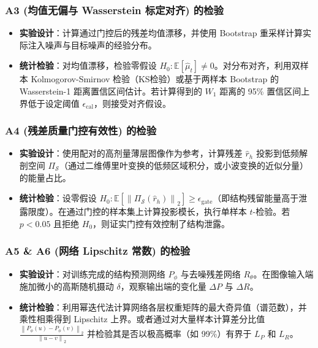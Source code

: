 \documentclass[11pt,a4paper,UTF8,fontset=fandol]{ctexart}
\theoremstyle{definition}
\newcommand{\norm}[1]{\left\lVert#1\right\rVert}
\newcommand{\E}{\mathbb{E}}
\newcommand{\cS}{\mathcal{S}}
\begin{document}
\subsubsection{A3 (均值无偏与 Wasserstein 标定对齐) 的检验}
\begin{itemize}[leftmargin=2em]
    \item \textbf{实验设计}：计算通过门控后的残差均值漂移，并使用 Bootstrap 重采样计算实际注入噪声与目标噪声的经验分布。
    \item \textbf{统计检验}：对均值漂移，检验零假设 $H_0: \E[\hat\mu_t] \ne 0$。对分布对齐，利用双样本 Kolmogorov-Smirnov 检验（KS检验）或基于两样本 Bootstrap 的 Wasserstein-1 距离置信区间估计。若计算得到的 $W_1$ 距离的 95\% 置信区间上界低于设定阈值 $\epsilon_{\mathrm{cal}}$，则接受对齐假设。
\end{itemize}

\subsubsection{A4 (残差质量门控有效性) 的检验}
\begin{itemize}[leftmargin=2em]
    \item \textbf{实验设计}：使用配对的高剂量薄层图像作为参考，计算残差 $\hat r_h$ 投影到低频解剖空间 $\Pi_{\cS}$（通过二维傅里叶变换的低频区域积分，或小波变换的近似分量）的能量占比。
    \item \textbf{统计检验}：设零假设 $H_0: \E[\norm{\Pi_{\cS}(\hat r_h)}_2] \ge \epsilon_{\mathrm{gate}}$（即结构残留能量高于泄露限度）。在通过门控的样本集上计算投影模长，执行单样本 $t$-检验。若 $p < 0.05$ 且拒绝 $H_0$，则证实门控有效控制了结构泄露。
\end{itemize}

\subsubsection{A5 \& A6 (网络 Lipschitz 常数) 的检验}
\begin{itemize}[leftmargin=2em]
    \item \textbf{实验设计}：对训练完成的结构预测网络 $P_\phi$ 与去噪残差网络 $R_\theta$。在图像输入端施加微小的高斯随机摄动 $\delta$，观察输出端的变化量 $\Delta P$ 与 $\Delta R$。
    \item \textbf{统计检验}：利用幂迭代法计算网络各层权重矩阵的最大奇异值（谱范数），并乘性相乘得到 Lipschitz 上界。或者通过对大量样本计算差分比值 $\frac{\norm{P_\phi(u) - P_\phi(v)}_2}{\norm{u-v}_2}$ 并检验其是否以极高概率（如 99\%）有界于 $L_P$ 和 $L_R$。
\end{itemize}
\end{document}
